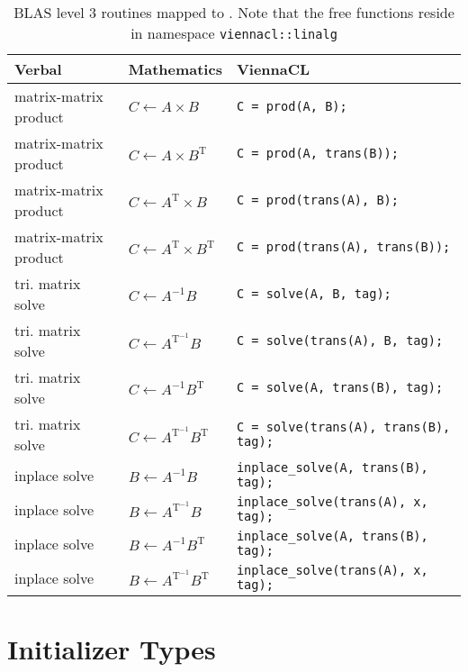 \begin{table}[tb]
\begin{center}
\renewcommand{\arraystretch}{1.2}
\begin{tabular}{p{4cm}|l|p{7.5cm}}
Verbal & Mathematics & ViennaCL\\
\hline
matrix-matrix product & $C \leftarrow A \times B$ & \lstinline|C = prod(A, B);| \\
matrix-matrix product & $C \leftarrow A \times B^\mathrm{T}$ & \lstinline|C = prod(A, trans(B));| \\
matrix-matrix product & $C \leftarrow A^\mathrm{T} \times B$ & \lstinline|C = prod(trans(A), B);| \\
matrix-matrix product & $C \leftarrow A^\mathrm{T} \times B^\mathrm{T}$ & \lstinline|C = prod(trans(A), trans(B));| \\
\hline
tri. matrix solve & $C \leftarrow A^{-1} B$ & \lstinline|C = solve(A, B, tag);| \\
tri. matrix solve & $C \leftarrow A^\mathrm{T^{-1}} B$ & \lstinline|C = solve(trans(A), B, tag);| \\
tri. matrix solve & $C \leftarrow A^{-1} B^\mathrm{T}$ & \lstinline|C = solve(A, trans(B), tag);| \\
tri. matrix solve & $C \leftarrow A^\mathrm{T^{-1}} B^\mathrm{T}$ & \lstinline|C = solve(trans(A), trans(B), tag);| \\
%
inplace solve & $B \leftarrow A^{-1} B$ & \lstinline|inplace_solve(A, trans(B), tag);| \\
inplace solve & $B \leftarrow A^\mathrm{T^{-1}} B$ & \lstinline|inplace_solve(trans(A), x, tag);| \\
inplace solve & $B \leftarrow A^{-1} B^\mathrm{T}$ & \lstinline|inplace_solve(A, trans(B), tag);| \\
inplace solve & $B \leftarrow A^\mathrm{T^{-1}} B^\mathrm{T}$ & \lstinline|inplace_solve(trans(A), x, tag);| \\
\end{tabular}
\caption{BLAS level 3 routines mapped to \ViennaCL. Note that the free functions
reside in namespace \texttt{viennacl::linalg}}
\label{tab:blas-level-3}
\end{center}
\end{table}

\section{Initializer Types}


